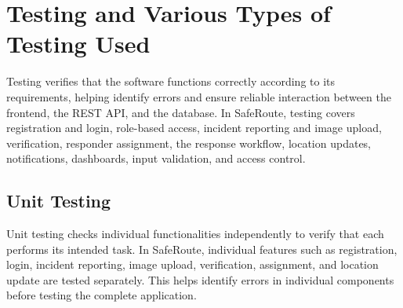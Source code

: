 \documentclass[a4paper,12pt]{report}
\begin{document}
	\begin{table}[h!]
		\centering
		\caption{Project Schedule}
		\label{tab:schedule}
	\end{table}
	
	\section{Testing and Various Types of Testing Used}
	
	Testing verifies that the software functions correctly according to its requirements, helping identify errors and ensure reliable interaction between the frontend, the REST API, and the database. In SafeRoute, testing covers registration and login, role-based access, incident reporting and image upload, verification, responder assignment, the response workflow, location updates, notifications, dashboards, input validation, and access control.
	
	\subsection{Unit Testing}
	
	Unit testing checks individual functionalities independently to verify that each performs its intended task. In SafeRoute, individual features such as registration, login, incident reporting, image upload, verification, assignment, and location update are tested separately. This helps identify errors in individual components before testing the complete application.
	
\end{document}
